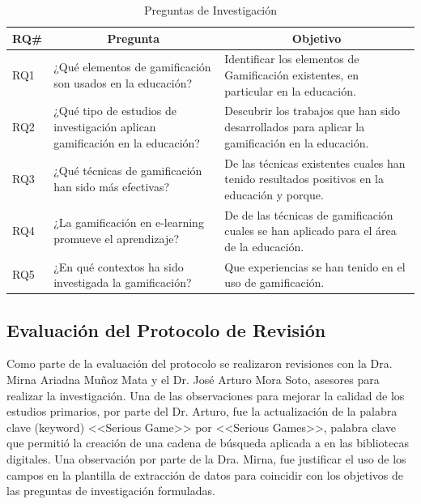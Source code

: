 \documentclass{report}
\begin{document}
            \begin{table}
                \begin{center}
                    \caption{Preguntas de Investigación}
                    \label{table:researchQuestions}
                    \begin{tabular}{| l | p{6cm} | p{6cm} |}
                        \toprule
                        \hline
                        \multicolumn{1}{|c|}{\textbf{RQ\#}} & \multicolumn{1}{|c|}{\textbf{Pregunta}}  & \multicolumn{1}{|c|}{\textbf{Objetivo}} \\
                        \hline
                        RQ1 & ¿Qué elementos de gamificación son usados en la educación? & Identificar los elementos de Gamificación existentes, en particular en la educación. \\
                        \hline
                        RQ2 & ¿Qué tipo de estudios de investigación aplican gamificación en la educación? & Descubrir los trabajos que han sido desarrollados para aplicar la gamificación en la educación. \\
                        \hline
                        RQ3 & ¿Qué técnicas de gamificación han sido más efectivas? & De las técnicas existentes cuales han tenido resultados positivos en la educación y porque. \\
                        \hline
                        RQ4 & ¿La gamificación en e-learning promueve el aprendizaje? & De de las técnicas de gamificación cuales se han aplicado para el área de la educación.\\
                        \hline
                        RQ5 & ¿En qué contextos ha sido investigada la gamificación? & Que experiencias se han tenido en el uso de gamificación.\\
                        \hline
                    \end{tabular}
                \end{center}
            \end{table}
            
            \subsection{Evaluación del Protocolo de Revisión}

            Como parte de la evaluación del protocolo se realizaron revisiones con la Dra. Mirna Ariadna Muñoz Mata y el Dr. José Arturo Mora Soto, asesores para realizar la investigación. Una de las observaciones para mejorar la calidad de los estudios primarios, por parte del Dr. Arturo, fue la actualización de la palabra clave (keyword) <<Serious Game>> por <<Serious Games>>, palabra clave que permitió la creación de una cadena de búsqueda aplicada a en las bibliotecas digitales. Una observación por parte de la Dra. Mirna, fue justificar el uso de los campos en la plantilla de extracción de datos para coincidir con los objetivos de las preguntas de investigación formuladas.
            
\end{document}
